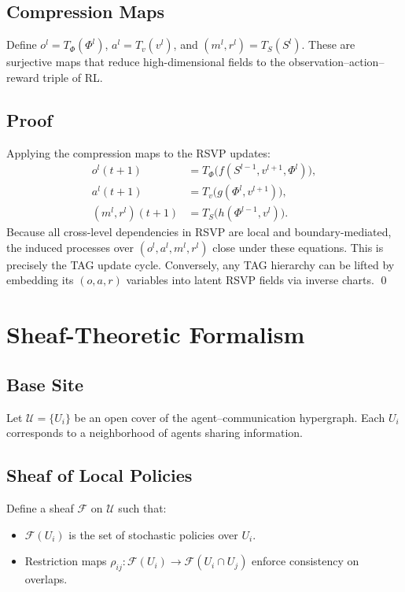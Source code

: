 \documentclass[11pt,a4paper]{article}
\begin{document}
\subsection{Compression Maps}
Define $o^l = T_\Phi(\Phi^l)$, $a^l = T_v(v^l)$, and $(m^l,r^l)=T_S(S^l)$. These are surjective maps that reduce high-dimensional fields to the observation–action–reward triple of RL.

\subsection{Proof}
Applying the compression maps to the RSVP updates:
\begin{align}
o^l(t+1) &= T_\Phi\!\big(f(S^{l-1},v^{l+1},\Phi^l)\big), \\
a^l(t+1) &= T_v\!\big(g(\Phi^l,v^{l+1})\big), \\
(m^l,r^l)(t+1) &= T_S\!\big(h(\Phi^{l-1},v^l)\big).
\end{align}
Because all cross-level dependencies in RSVP are local and boundary-mediated, the induced processes over $(o^l,a^l,m^l,r^l)$ close under these equations. This is precisely the TAG update cycle. Conversely, any TAG hierarchy can be lifted by embedding its $(o,a,r)$ variables into latent RSVP fields via inverse charts. \qed


\section{Sheaf-Theoretic Formalism}
\label{app:sheaf}

\subsection{Base Site}
Let $\mathcal{U} = \{U_i\}$ be an open cover of the agent–communication hypergraph. Each $U_i$ corresponds to a neighborhood of agents sharing information.

\subsection{Sheaf of Local Policies}
Define a sheaf $\mathcal{F}$ on $\mathcal{U}$ such that:
\begin{itemize}
\item $\mathcal{F}(U_i)$ is the set of stochastic policies over $U_i$.
\item Restriction maps $\rho_{ij}: \mathcal{F}(U_i) \to \mathcal{F}(U_i\cap U_j)$ enforce consistency on overlaps.
\end{itemize}
\end{document}
